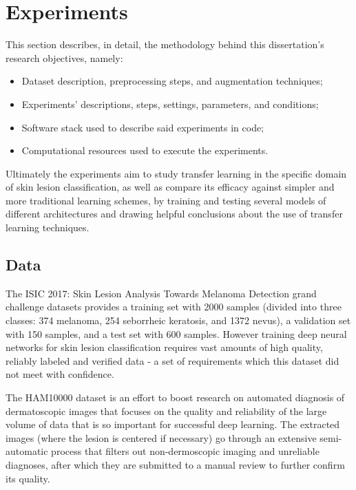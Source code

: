 \chapter{Experiments}
\label{chapter:experiments}

This section describes, in detail, the methodology behind this dissertation's research objectives, namely:

\begin{itemize}
    \item Dataset description, preprocessing steps, and augmentation techniques;
    \item Experiments' descriptions, steps, settings, parameters, and conditions;
    \item Software stack used to describe said experiments in code;
    \item Computational resources used to execute the experiments.
\end{itemize}

Ultimately the experiments aim to study transfer learning in the specific domain of skin lesion classification, as well as compare its efficacy against simpler and more traditional learning schemes, by training and testing several models of different architectures and drawing helpful conclusions about the use of transfer learning techniques.

\section{Data}

The ISIC 2017: Skin Lesion Analysis Towards Melanoma Detection grand challenge datasets \cite{isic2017} provides a training set with 2000 samples (divided into three classes: 374 melanoma, 254 seborrheic keratosis, and 1372 nevus), a validation set with 150 samples, and a test set with 600 samples. However training deep neural networks for skin lesion classification requires vast amounts of high quality, reliably labeled and verified data - a set of requirements which this dataset did not meet with confidence.

The HAM10000 \cite{ham10000} dataset is an effort to boost research on automated diagnosis of dermatoscopic images that focuses on the quality and reliability of the large volume of data that is so important for successful deep learning. The extracted images (where the lesion is centered if necessary) go through an extensive semi-automatic process that filters out non-dermoscopic imaging and unreliable diagnoses, after which they are submitted to a manual review to further confirm its quality.

